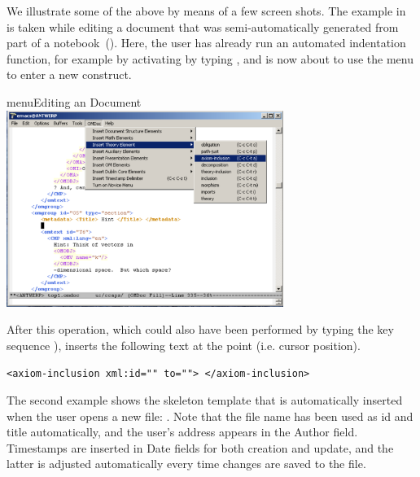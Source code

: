 We illustrate some of the above by means of a few screen shots.  The example in
{} is taken while editing a document that was semi-automatically generated
from part of a {\mathematica} notebook~(\cite{Sutner:cmnto04}).  Here, the user has
already run an automated indentation function, for example by activating
{} by typing {}, and is now about to
use the {\omdoc} menu to enter a new construct.


\begin{myfig}{menu}{Editing an {\omdoc} Document}
  \includegraphics[width=9cm]{projects/omdocmode/omdoc1c}
\end{myfig}

After this operation, which could also have been performed by typing the key sequence
{}), {\emacs} inserts the following text at the point (i.e. cursor
position).
\begin{lstlisting}
<axiom-inclusion xml:id="" to=""> </axiom-inclusion>
\end{lstlisting}

The second example shows the skeleton template that is automatically inserted when the
user opens a new file: {}.  Note that the file name has been used as id
and title automatically, and the user's address appears in the Author field.  Timestamps
are inserted in Date fields for both creation and update, and the latter is adjusted
automatically every time changes are saved to the file.


